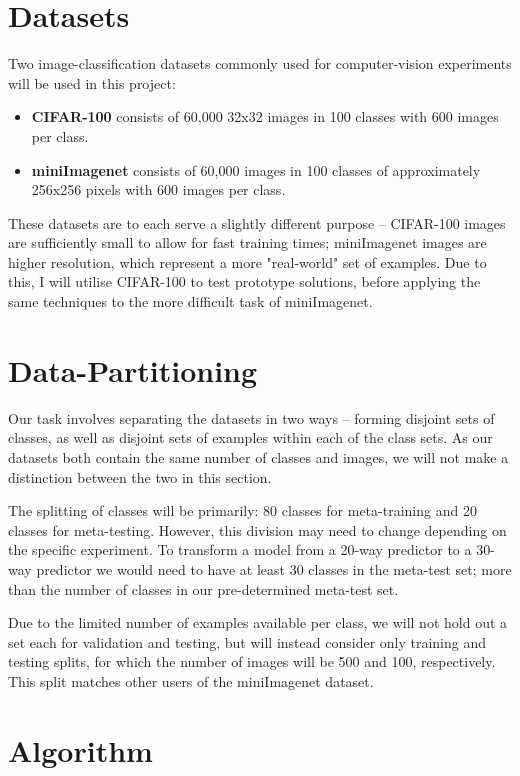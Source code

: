 \documentclass{report}
\begin{document}
	\section{Datasets}
	Two image-classification datasets commonly used for computer-vision experiments will be used in this project:
	\begin{itemize}
		\item \textbf{CIFAR-100}\parencite{cifar100} consists of 60,000 32x32 images in 100 classes with 600 images per class. 
		\item \textbf{miniImagenet}\parencite{ilsvr} consists of 60,000 images in 100 classes of approximately 256x256 pixels with 600 images per class.
	\end{itemize}
	These datasets are to each serve a slightly different purpose -- CIFAR-100 images are sufficiently small to allow for fast training times; miniImagenet images are higher resolution, which represent a more "real-world" set of examples. Due to this, I will utilise CIFAR-100 to test prototype solutions, before applying the same techniques to the more difficult task of miniImagenet. \par 

	\section{Data-Partitioning}
	Our task involves separating the datasets in two ways -- forming disjoint sets of classes, as well as disjoint sets of examples within each of the class sets. As our datasets both contain the same number of classes and images, we will not make a distinction between the two in this section. \par
	The splitting of classes will be primarily: 80 classes for meta-training and 20 classes for meta-testing. However, this division may need to change depending on the specific experiment. To transform a model from a 20-way predictor to a 30-way predictor we would need to have at least 30 classes in the meta-test set; more than the number of classes in our pre-determined meta-test set. \par
	Due to the limited number of examples available per class, we will not hold out a set each for validation and testing, but will instead consider only training and testing splits, for which the number of images will be 500 and 100, respectively. This split matches other users of the miniImagenet dataset. \par
	
	\section{Algorithm}
\end{document}
